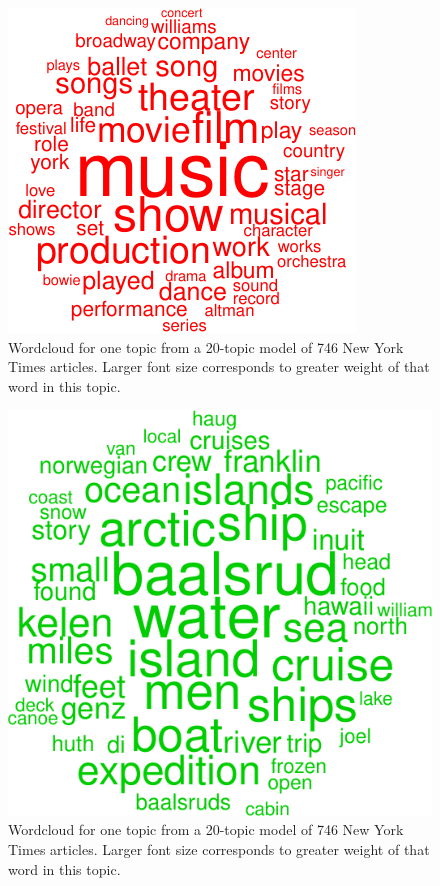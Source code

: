 \documentclass[12pt,]{article}
\begin{document}
\begin{figure}
\includegraphics[width=\textwidth]{lda-tutorial-2016_files/figure-latex/wordcloud1-1.pdf}
\caption{Wordcloud for one topic from a 20-topic model of 746 New York Times articles. Larger font size corresponds to greater weight of that word in this topic.\label{fig:wc1}}
\end{figure}

\begin{figure}
\includegraphics[width=\textwidth]{lda-tutorial-2016_files/figure-latex/wordcloud1-2.pdf}
\caption{Wordcloud for one topic from a 20-topic model of 746 New York Times articles. Larger font size corresponds to greater weight of that word in this topic.\label{fig:wc2}}
\end{figure}
\end{document}
